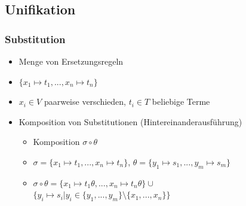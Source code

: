 \documentclass[12pt,a4paper]{article}
\begin{document}
\subsection{Unifikation}
\subsubsection{Substitution}
\begin{itemize}
\item Menge von Ersetzungsregeln
\item $\{x_1\mapsto t_1,...,x_n\mapsto t_n\}$
\item $x_i \in V$ paarweise verschieden, $t_i\in T$ beliebige Terme
\item Komposition von Substitutionen (Hintereinanderausführung)
\begin{itemize}
\item Komposition $\sigma \circ \theta$
\item $\sigma = \{x_1\mapsto t_1,...,x_n\mapsto t_n\}$, $\theta = \{y_1\mapsto s_1,...,y_m\mapsto s_m\}$
\item $\sigma \circ \theta = \{x_1\mapsto t_1 \theta ,...,x_n \mapsto t_n \theta \} \cup $\\
$\{ y_i \mapsto s_i \vert y_i \in 
\{ y_1,...,y_m \} \setminus \{x_1,...,x_n \} \}$
\end{itemize}
\end{itemize}
\end{document}
